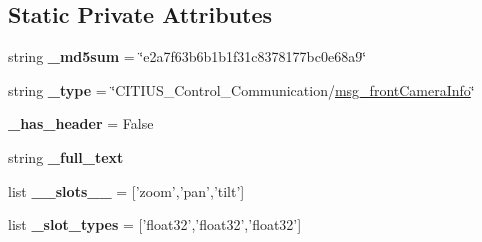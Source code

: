 \subsection*{\-Static \-Private \-Attributes}
\begin{DoxyCompactItemize}
\item 
\hypertarget{class_c_i_t_i_u_s___control___communication_1_1msg_1_1__msg__front_camera_info_1_1msg__front_camera_info_adaaee9c840548f1f6e31a83358705c4e}{string {\bfseries \-\_\-md5sum} = \char`\"{}e2a7f63b6b1b1f31c8378177bc0e68a9\char`\"{}}\label{class_c_i_t_i_u_s___control___communication_1_1msg_1_1__msg__front_camera_info_1_1msg__front_camera_info_adaaee9c840548f1f6e31a83358705c4e}

\item 
\hypertarget{class_c_i_t_i_u_s___control___communication_1_1msg_1_1__msg__front_camera_info_1_1msg__front_camera_info_a6624081fb00c06dff239195f7ef9a080}{string {\bfseries \-\_\-type} = \char`\"{}\-C\-I\-T\-I\-U\-S\-\_\-\-Control\-\_\-\-Communication/\hyperlink{class_c_i_t_i_u_s___control___communication_1_1msg_1_1__msg__front_camera_info_1_1msg__front_camera_info}{msg\-\_\-front\-Camera\-Info}\char`\"{}}\label{class_c_i_t_i_u_s___control___communication_1_1msg_1_1__msg__front_camera_info_1_1msg__front_camera_info_a6624081fb00c06dff239195f7ef9a080}

\item 
\hypertarget{class_c_i_t_i_u_s___control___communication_1_1msg_1_1__msg__front_camera_info_1_1msg__front_camera_info_a980c77822a8a19310512c2672b5e02d7}{{\bfseries \-\_\-has\-\_\-header} = \-False}\label{class_c_i_t_i_u_s___control___communication_1_1msg_1_1__msg__front_camera_info_1_1msg__front_camera_info_a980c77822a8a19310512c2672b5e02d7}

\item 
string {\bfseries \-\_\-full\-\_\-text}
\item 
\hypertarget{class_c_i_t_i_u_s___control___communication_1_1msg_1_1__msg__front_camera_info_1_1msg__front_camera_info_a6f56306ccb4de70db252e2580f5531be}{list {\bfseries \-\_\-\-\_\-slots\-\_\-\-\_\-} = \mbox{[}'zoom','pan','tilt'\mbox{]}}\label{class_c_i_t_i_u_s___control___communication_1_1msg_1_1__msg__front_camera_info_1_1msg__front_camera_info_a6f56306ccb4de70db252e2580f5531be}

\item 
\hypertarget{class_c_i_t_i_u_s___control___communication_1_1msg_1_1__msg__front_camera_info_1_1msg__front_camera_info_a37b6885d158755bda66a7ec0d5b65b8f}{list {\bfseries \-\_\-slot\-\_\-types} = \mbox{[}'float32','float32','float32'\mbox{]}}\label{class_c_i_t_i_u_s___control___communication_1_1msg_1_1__msg__front_camera_info_1_1msg__front_camera_info_a37b6885d158755bda66a7ec0d5b65b8f}

\end{DoxyCompactItemize}



